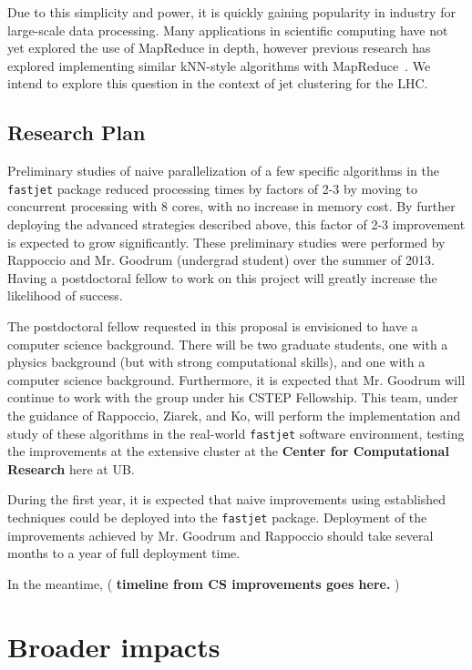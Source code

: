 \documentclass[times,11pt]{article}
\begin{document}
Due to this simplicity and power, it is quickly gaining popularity in industry
for large-scale data processing. Many applications in scientific computing have not
yet explored the use of MapReduce in depth, however
previous research has explored implementing similar kNN-style
algorithms with
MapReduce~\cite{knn-mapreduce-0, knn-mapreduce-1}. We intend to explore this
question in the context of jet clustering for the LHC.



\subsection{Research Plan}

Preliminary studies of naive parallelization of a few specific
algorithms in the {\tt fastjet} package reduced processing times by
factors of 2-3 by moving to concurrent processing with 8 cores, with
no increase in memory cost. By further deploying the advanced
strategies described above, this factor of 2-3 improvement is expected
to grow significantly. 
These preliminary studies were performed by Rappoccio and Mr.
Goodrum (undergrad student) over the summer of 2013. Having a
postdoctoral fellow to work on this project will greatly increase the
likelihood of success. 

The postdoctoral fellow requested in this proposal is envisioned to
have a computer science background. There will be two graduate
students, one with a physics background (but with strong computational
skills), and one with a computer science background. Furthermore, it
is expected that Mr. Goodrum will continue to work with the group
under his CSTEP Fellowship. This team, under
the guidance of Rappoccio, Ziarek, and Ko, will perform the
implementation and study of these algorithms in the real-world 
{\tt fastjet} software environment, testing the improvements at the
extensive cluster at the {\bf Center for Computational Research} here
at UB. 

During the first year, it is expected that naive improvements using
established techniques could be deployed into the {\tt fastjet}
package. Deployment of the improvements achieved by Mr. Goodrum and
Rappoccio should take several months to a year of full deployment
time. 

In the meantime, ( {\bf timeline from CS improvements goes here.} )

\section{Broader impacts}
\end{document}
